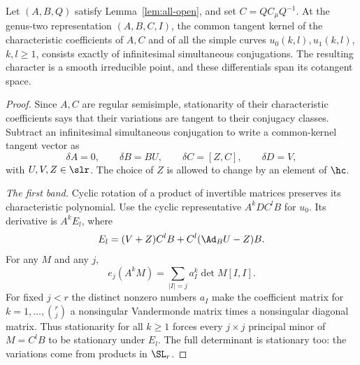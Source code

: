 \begin{proposition}\label{prop:core}
Let $(A,B,Q)$ satisfy Lemma~\ref{lem:all-open}, and set $C=QC_\mu Q^{-1}$.
At the genus-two representation $(A,B,C,I)$, the common tangent kernel of
the characteristic coefficients of $A,C$ and of all the simple curves
$u_0(k,l),u_1(k,l)$, $k,l\geq1$, consists exactly of infinitesimal
simultaneous conjugations. The resulting character is a smooth
irreducible point, and these differentials span its cotangent space.
\end{proposition}
\begin{proof}
Since $A,C$ are regular semisimple, stationarity of their characteristic
coefficients says that their variations are tangent to their conjugacy
classes. Subtract an infinitesimal simultaneous conjugation to write a
common-kernel tangent vector as
\begin{equation}\label{eq:initial-gauge}
 \delta A=0,\qquad \delta B=BU,\qquad
 \delta C=[Z,C],\qquad \delta D=V,
\end{equation}
with $U,V,Z\in\slr$. The choice of $Z$ is allowed to change by an element
of $\hc$.

\smallskip\noindent\emph{The first band.}
Cyclic rotation of a product of invertible matrices preserves its
characteristic polynomial. Use the cyclic representative $A^kDC^lB$
for $u_0$. Its derivative is $A^kE_l$, where
\begin{equation}\label{eq:first-variation}
 E_l=(V+Z)C^lB+C^l(\Ad_B U-Z)B.
\end{equation}
For any $M$ and any $j$,
\begin{equation}\label{eq:Vandermonde}
 e_j(A^kM)=\sum_{|I|=j}a_I^k\det M[I,I].
\end{equation}
For fixed $j<r$ the distinct nonzero numbers $a_I$ make the coefficient
matrix for $k=1,\ldots,\binom rj$ a nonsingular Vandermonde matrix times
a nonsingular diagonal matrix. Thus stationarity for all $k\geq1$
forces every $j\times j$ principal minor of $M=C^lB$ to be stationary
under $E_l$. The full determinant is stationary too: the variations come
from products in $\SL_r$.


\end{proof}
